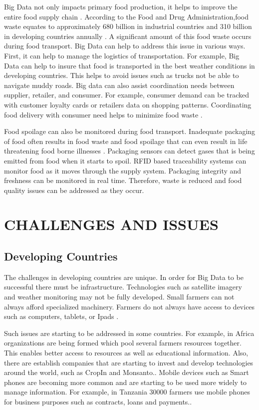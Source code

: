 \documentclass[sigconf]{acmart}
\begin{document}
Big Data not only impacts primary food production, it helps to improve the entire food supply chain \cite{Wolfert}. According to the Food and Drug Administration,food waste equates to approximately 680 billion in industrial countries and 310 billion in developing countries annually \cite{DevEcon}.  A significant amount of this food waste occurs during food transport. Big Data can help to address this issue in various ways. First, it can help to manage the logistics of transportation. For example, Big Data can help to insure that food is transported in the best weather conditions in developing countries.  This helps to avoid issues such as trucks not be able to navigate muddy roads. Big data can also assist coordination needs between supplier, retailer, and consumer. For example, consumer demand can be tracked with customer loyalty cards or retailers data on shopping patterns.  Coordinating food delivery with consumer need helps to minimize food waste \cite{DevEcon}.

Food spoilage can also be monitored during food transport. Inadequate packaging of food often results in food waste and food spoilage that can even result in life threatening food borne illnesses \cite{www-google-bigdatatech}.  Packaging sensors can detect gases that is being emitted from food when it starts to spoil.  RFID based traceability systems can monitor food as it moves through the supply system. Packaging integrity and freshness can be monitored in real time. Therefore, waste is reduced and food quality issues can be addressed as they occur. \cite{www-google-bigdatatech} 


\section{CHALLENGES AND ISSUES}

\subsection{Developing Countries}

The challenges in developing countries are unique.  In order for Big Data to be successful there must be infrastructure.  Technologies such as satellite imagery and weather monitoring may not be fully developed.  Small farmers can not always afford specialized machinery.  Farmers do not always have access to devices such as computers, tablets, or Ipads \cite{DevEcon}. 

Such issues are starting to be addressed in some countries. For example, in Africa organizations are being formed which pool several farmers resources together. This  enables better access to resources as well as educational information.  Also, there are establish companies that are starting to invest and develop technologies around the world, such as CropIn and Monsanto.\cite {DevEcon}.  Mobile devices such as Smart phones are becoming more common and are starting to be used more widely to manage information. For example, in Tanzania 30000 farmers use mobile phones for business purposes such as contracts, loans and payments.\cite{www-google-Wikipedia}.
\end{document}

